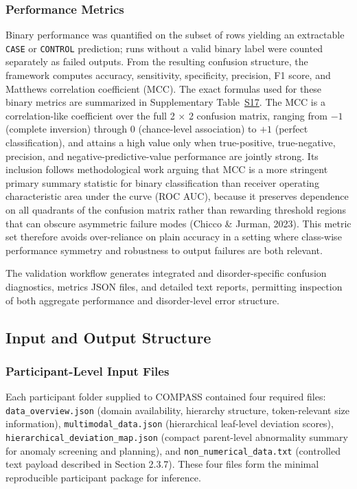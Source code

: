 \documentclass[11pt,a4paper,twoside]{article}
\begin{document}
\subsubsection{Performance Metrics}
Binary performance was quantified on the subset of rows yielding an extractable \texttt{CASE} or \texttt{CONTROL} prediction; runs without a valid binary label were counted separately as failed outputs. From the resulting confusion structure, the framework computes accuracy, sensitivity, specificity, precision, F1 score, and Matthews correlation coefficient (MCC). The exact formulas used for these binary metrics are summarized in Supplementary Table~\hyperref[tab:s17]{S17}. The MCC is a correlation-like coefficient over the full 2 $\times$ 2 confusion matrix, ranging from $-1$ (complete inversion) through $0$ (chance-level association) to $+1$ (perfect classification), and attains a high value only when true-positive, true-negative, precision, and negative-predictive-value performance are jointly strong. Its inclusion follows methodological work arguing that MCC is a more stringent primary summary statistic for binary classification than receiver operating characteristic area under the curve (ROC AUC), because it preserves dependence on all quadrants of the confusion matrix rather than rewarding threshold regions that can obscure asymmetric failure modes (Chicco \& Jurman, 2023). This metric set therefore avoids over-reliance on plain accuracy in a setting where class-wise performance symmetry and robustness to output failures are both relevant.

The validation workflow generates integrated and disorder-specific confusion diagnostics, metrics JSON files, and detailed text reports, permitting inspection of both aggregate performance and disorder-level error structure.

\subsection{Input and Output Structure}
\subsubsection{Participant-Level Input Files}
Each participant folder supplied to COMPASS contained four required files: \texttt{data\_{\allowbreak}overview.{\allowbreak}json} (domain availability, hierarchy structure, token-relevant size information), \texttt{multimodal\_{\allowbreak}data.{\allowbreak}json} (hierarchical leaf-level deviation scores), \texttt{hierarchical\_{\allowbreak}deviation\_{\allowbreak}map.{\allowbreak}json} (compact parent-level abnormality summary for anomaly screening and planning), and \texttt{non\_{\allowbreak}numerical\_{\allowbreak}data.{\allowbreak}txt} (controlled text payload described in Section 2.3.7). These four files form the minimal reproducible participant package for inference.
\end{document}
